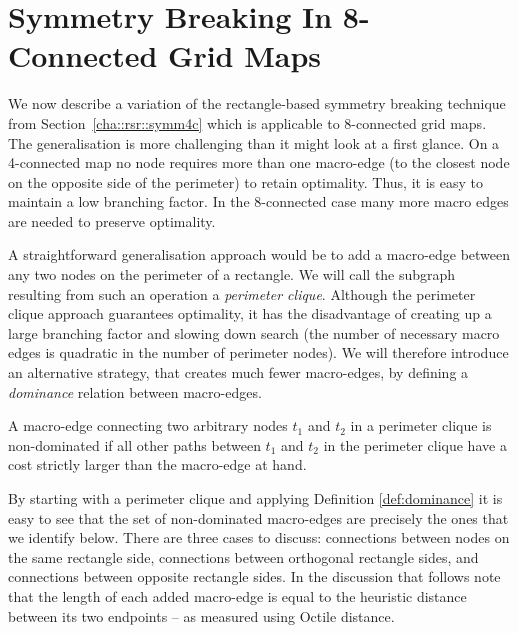 \section{Symmetry Breaking In 8-Connected Grid Maps}
\label{cha::rsr::symm8c}
We now describe a variation of the rectangle-based symmetry breaking
technique from Section~\ref{cha::rsr::symm4c} which is applicable to 
8-connected grid maps.  The generalisation is more challenging than it might look
at a first glance.  On a 4-connected map no node requires more than one
macro-edge (to the closest node on the opposite side of the perimeter) to retain
optimality.  Thus, it is easy to maintain a low branching factor.
In the 8-connected case many more macro edges are needed to preserve optimality.

A straightforward generalisation approach would be to add a macro-edge between any
two nodes on the perimeter of a rectangle.  We will call the subgraph resulting
from such an operation a \emph{perimeter clique}.
Although the perimeter clique approach guarantees optimality, it has the
disadvantage of creating up a large branching factor and slowing down search
(the number of necessary macro edges is quadratic in the number of 
perimeter nodes).  We will therefore
introduce an alternative strategy, that creates much fewer macro-edges, by
defining a \emph{dominance} relation between macro-edges.

\begin{definition}
\label{def:dominance}
A macro-edge connecting two arbitrary nodes $t_1$ and $t_2$ in a perimeter
clique is non-dominated if all other paths between $t_1$ and $t_2$ in the
perimeter clique have a cost strictly larger than the macro-edge at hand.
\end{definition}

By starting with a perimeter clique and applying Definition \ref{def:dominance}
it is easy to see that the set of non-dominated macro-edges are precisely the
ones that we identify below.  There are three cases to discuss: connections
between nodes on the same rectangle side, connections between orthogonal
rectangle sides, and connections between opposite rectangle sides.
In the discussion that follows note that the length of each added macro-edge 
is equal to the heuristic distance between its two endpoints -- as measured
using Octile distance.


